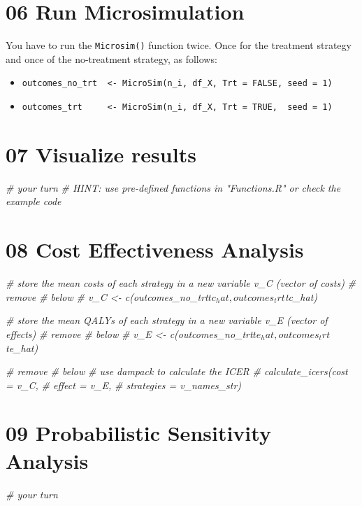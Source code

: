 \documentclass[
]{article}
\newenvironment{Shaded}{\begin{snugshade}}{\end{snugshade}}
\newcommand{\CommentTok}[1]{\textcolor[rgb]{0.56,0.35,0.01}{\textit{#1}}}
\begin{document}
\hypertarget{run-microsimulation}{%
\section{06 Run Microsimulation}\label{run-microsimulation}}

You have to run the \texttt{Microsim()} function twice. Once for the
treatment strategy and once of the no-treatment strategy, as follows:

\begin{itemize}
\item
  \texttt{outcomes\_no\_trt\ \ \textless{}-\ MicroSim(n\_i,\ df\_X,\ Trt\ =\ FALSE,\ seed\ =\ 1)}
\item
  \texttt{outcomes\_trt\ \ \ \ \ \textless{}-\ MicroSim(n\_i,\ df\_X,\ Trt\ =\ TRUE,\ \ seed\ =\ 1)}
\end{itemize}

\hypertarget{visualize-results}{%
\section{07 Visualize results}\label{visualize-results}}

\begin{Shaded}
\begin{Highlighting}[]
\CommentTok{# your turn}
\CommentTok{# HINT: use pre-defined functions in "Functions.R" or check the example code}
\end{Highlighting}
\end{Shaded}

\hypertarget{cost-effectiveness-analysis}{%
\section{08 Cost Effectiveness
Analysis}\label{cost-effectiveness-analysis}}

\begin{Shaded}
\begin{Highlighting}[]
\CommentTok{# store the mean costs of each strategy in a new variable v_C (vector of costs)}
\CommentTok{# remove # below}
\CommentTok{# v_C <- c(outcomes_no_trt$tc_hat, outcomes_trt$tc_hat)}

\CommentTok{# store the mean QALYs of each strategy in a new variable v_E (vector of effects)}
\CommentTok{# remove # below}
\CommentTok{# v_E <- c(outcomes_no_trt$te_hat, outcomes_trt$te_hat)}


\CommentTok{# remove # below}
\CommentTok{# use dampack to calculate the ICER}
\CommentTok{# calculate_icers(cost       = v_C,}
\CommentTok{#                 effect     = v_E,}
\CommentTok{#                 strategies = v_names_str)}
\end{Highlighting}
\end{Shaded}

\hypertarget{probabilistic-sensitivity-analysis}{%
\section{09 Probabilistic Sensitivity
Analysis}\label{probabilistic-sensitivity-analysis}}

\begin{Shaded}
\begin{Highlighting}[]
\CommentTok{# your turn}
\end{Highlighting}
\end{Shaded}
\end{document}
